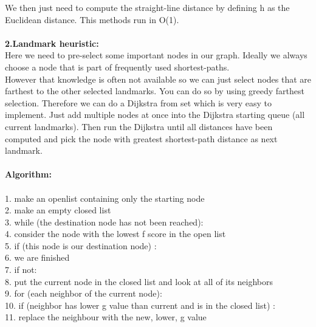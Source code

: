 \documentclass[14pt,a4]{extreport}
\begin{document}
We then just need to compute the straight-line distance by defining h as the Euclidean distance. 
This methods run in O(1).
\\\\
\textbf{2.Landmark heuristic:}\\
Here we need to pre-select some important nodes in our graph. Ideally we always choose a node that is part of frequently used shortest-paths.\\

However that knowledge is often not available so we can just select nodes that are farthest to the other selected landmarks. You can do so by using greedy farthest selection. Therefore we can do a Dijkstra from set which is very easy to implement. Just add multiple nodes at once into the Dijkstra starting queue (all current landmarks). Then run the Dijkstra until all distances have been computed and pick the node with greatest shortest-path distance as next landmark.
\\        \\    
\textbf{Algorithm:}\\
\\
1. make an openlist containing only the starting node\\
2. make an empty closed list\\
3.   while (the destination node has not been reached):\\
4. \hspace{10}       consider the node with the lowest f score in the open list\\
5.  \hspace{10}     if (this node is our destination node) :\\
6.   \hspace{20}        we are finished \\
7.  \hspace{10}     if not:\\
8.   \hspace{20}          put the current node in the closed list and look at all of its neighbors\\
9.    \hspace{20}         for (each neighbor of the current node):\\
10.   \hspace{20}              if (neighbor has lower g value than current and is in the closed list) :\\
11.     \hspace{40}               replace the neighbour with the new, lower, g value \\
\end{document}

